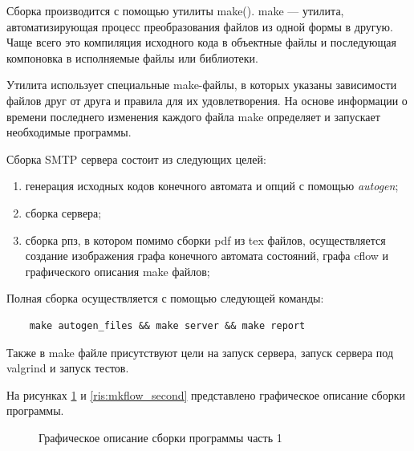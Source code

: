 \documentclass[a4paper,12pt]{report}
\begin{document}
Сборка производится с помощью утилиты make(\cite{make}). make — утилита, автоматизирующая процесс преобразования файлов из одной формы в другую. Чаще всего это компиляция исходного кода в объектные файлы и последующая компоновка в исполняемые файлы или библиотеки.

Утилита использует специальные make-файлы, в которых указаны зависимости файлов друг от друга и правила для их удовлетворения. На основе информации о времени последнего изменения каждого файла make определяет и запускает необходимые программы.

Сборка SMTP сервера состоит из следующих целей:

\begin{enumerate}
	\item генерация исходных кодов конечного автомата и опций с помощью \textit{autogen};
    \item сборка сервера;
    \item сборка рпз, в котором помимо сборки pdf из tex файлов, осуществляется создание изображения графа конечного автомата состояний, графа cflow и графического описания make файлов;
    
\end{enumerate}



Полная сборка осуществляется с помощью следующей команды:
\begin{verbatim}
    make autogen_files && make server && make report
\end{verbatim}

Также в make файле присутствуют цели на запуск сервера, запуск сервера под valgrind и запуск тестов.

На рисунках \ref{ris:mkflow_first} 
и 
\ref{ris:mkflow_second} 
представлено графическое описание сборки программы.

\begin{figure}[h!]
\caption{Графическое описание сборки программы часть 1}
\label{ris:mkflow_first}
\end{figure}
\end{document}
